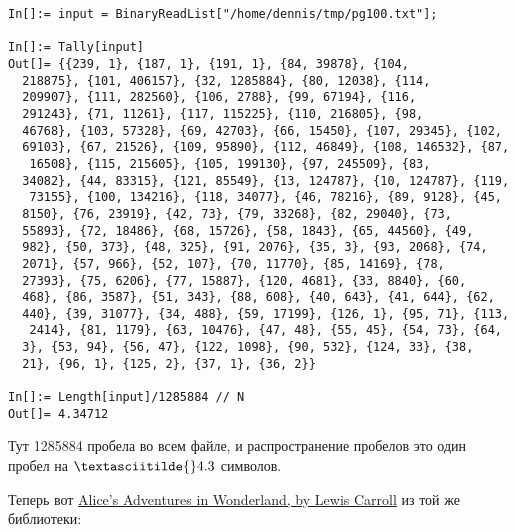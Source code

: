 \begin{lstlisting}[caption=Mathematica,style=custommath]
In[]:= input = BinaryReadList["/home/dennis/tmp/pg100.txt"];

In[]:= Tally[input]
Out[]= {{239, 1}, {187, 1}, {191, 1}, {84, 39878}, {104, 
  218875}, {101, 406157}, {32, 1285884}, {80, 12038}, {114, 
  209907}, {111, 282560}, {106, 2788}, {99, 67194}, {116, 
  291243}, {71, 11261}, {117, 115225}, {110, 216805}, {98, 
  46768}, {103, 57328}, {69, 42703}, {66, 15450}, {107, 29345}, {102, 
  69103}, {67, 21526}, {109, 95890}, {112, 46849}, {108, 146532}, {87,
   16508}, {115, 215605}, {105, 199130}, {97, 245509}, {83, 
  34082}, {44, 83315}, {121, 85549}, {13, 124787}, {10, 124787}, {119,
   73155}, {100, 134216}, {118, 34077}, {46, 78216}, {89, 9128}, {45, 
  8150}, {76, 23919}, {42, 73}, {79, 33268}, {82, 29040}, {73, 
  55893}, {72, 18486}, {68, 15726}, {58, 1843}, {65, 44560}, {49, 
  982}, {50, 373}, {48, 325}, {91, 2076}, {35, 3}, {93, 2068}, {74, 
  2071}, {57, 966}, {52, 107}, {70, 11770}, {85, 14169}, {78, 
  27393}, {75, 6206}, {77, 15887}, {120, 4681}, {33, 8840}, {60, 
  468}, {86, 3587}, {51, 343}, {88, 608}, {40, 643}, {41, 644}, {62, 
  440}, {39, 31077}, {34, 488}, {59, 17199}, {126, 1}, {95, 71}, {113,
   2414}, {81, 1179}, {63, 10476}, {47, 48}, {55, 45}, {54, 73}, {64, 
  3}, {53, 94}, {56, 47}, {122, 1098}, {90, 532}, {124, 33}, {38, 
  21}, {96, 1}, {125, 2}, {37, 1}, {36, 2}}

In[]:= Length[input]/1285884 // N
Out[]= 4.34712
\end{lstlisting}

Тут 1285884 пробела во всем файле, и распространение пробелов это один пробел на $\textasciitilde{}4.3$ символов.

Теперь вот \href{http://www.gutenberg.org/ebooks/11}{Alice's Adventures in Wonderland, by Lewis Carroll} из той же библиотеки:

